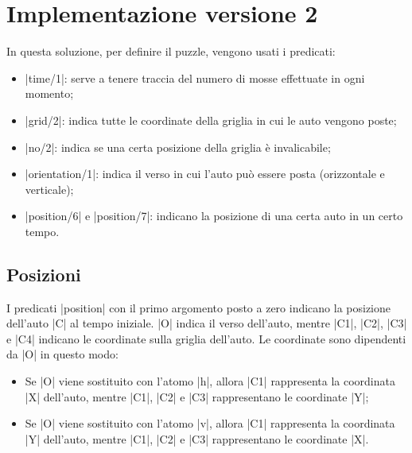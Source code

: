 \documentclass[10pt, a4paper, oneside]{article}
\begin{document}
\section{Implementazione versione 2}
In questa soluzione, per definire il puzzle, vengono usati i predicati:
\begin{itemize}
    \item {}|time/1|: serve a tenere traccia del numero di mosse effettuate in ogni momento;

    \item {}|grid/2|: indica tutte le coordinate della griglia in cui le auto vengono poste;

    \item {}|no/2|: indica se una certa posizione della griglia è invalicabile;

    \item {}|orientation/1|: indica il verso in cui l'auto può essere posta (orizzontale e verticale);

    \item {}|position/6| e |position/7|: indicano la posizione di una certa auto in un certo tempo.
\end{itemize}




\subsection{Posizioni}
I predicati |position| con il primo argomento posto a zero indicano la posizione dell'auto |C| al tempo iniziale. |O| indica il verso dell'auto, mentre |C1|, |C2|, |C3| e |C4| indicano le coordinate sulla griglia dell'auto. Le coordinate sono dipendenti da |O| in questo modo:
\begin{itemize}
    \item Se |O| viene sostituito con l'atomo |h|, allora |C1| rappresenta la coordinata |X| dell'auto, mentre |C1|, |C2| e |C3| rappresentano le coordinate |Y|;
    \item Se |O| viene sostituito con l'atomo |v|, allora |C1| rappresenta la coordinata |Y| dell'auto, mentre |C1|, |C2| e |C3| rappresentano le coordinate |X|.
\end{itemize}
\end{document}
